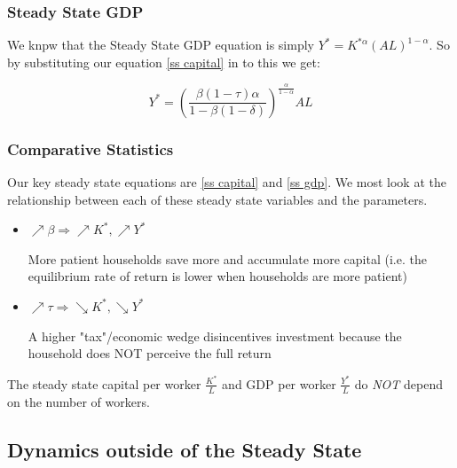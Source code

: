 \documentclass[11pt]{article}
\begin{document}
\subsubsection{Steady State GDP}
We knpw that the Steady State GDP equation is simply $Y^* = K^{*\alpha}(AL)^{1-\alpha}$. So by substituting our equation \eqref{ss capital} in to this we get:

\begin{mdframed}
    \begin{equation}
        \label{ss gdp}
        Y^* =\left(\frac{\beta(1-\tau) \alpha}{1-\beta(1-\delta)}\right)^{\frac{\alpha}{1-\alpha}} A L 
    \end{equation}
\end{mdframed}

\subsubsection{Comparative Statistics}

Our key steady state equations are \eqref{ss capital} and \eqref{ss gdp}. We most look at the relationship between each of these steady state variables and the parameters.

\begin{itemize}
    \item $\nearrow \beta \Rightarrow \nearrow K^*, \nearrow Y^*$

    \begin{intu}
        More patient households save more and accumulate more capital (i.e. the equilibrium rate of return is lower when households are more patient)
    \end{intu}
    \item $\nearrow \tau \Rightarrow \searrow K^*, \searrow Y^*$

    \begin{intu}
        A higher "tax"/economic wedge disincentives investment because the household does NOT perceive the full return
    \end{intu}
\end{itemize}

\begin{note}
    The steady state capital per worker $\frac{K^*}{L}$ and GDP per worker $\frac{Y^*}{L}$ do \textit{NOT} depend on the number of workers.
\end{note}

\subsection{Dynamics outside of the Steady State}
\end{document}
